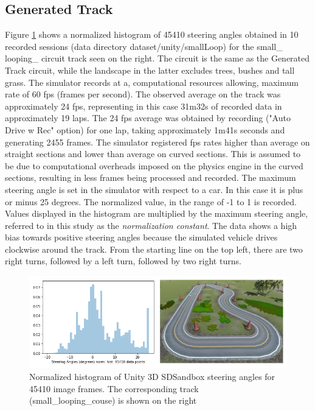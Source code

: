 \subsection{Generated Track}
Figure \ref{fig:GeneratedTrackPlusHist} shows a normalized histogram of 45410 steering angles obtained in 10 recorded sessions (data directory dataset/unity/smallLoop) for the small\_ looping\_ circuit track seen on the right. The circuit is the same as the Generated Track circuit, while the landscape in the latter excludes trees, bushes and tall grass. The simulator records at a, computational resources allowing, maximum rate of 60 fps (frames per second). The observed average on the track was approximately 24 fps, representing in this case 31m32s of recorded data in approximately 19 laps. The 24 fps average was obtained by recording ("Auto Drive w Rec" option) for one lap, taking approximately 1m41s seconds and generating 2455 frames. The simulator registered fps rates higher than average on straight sections and lower than average on curved sections. This is assumed to be due to computational overheads imposed on the physics engine in the curved sections, resulting in less frames being processed and recorded. The maximum steering angle is set in the simulator with respect to a car. In this case it is plus or minus 25 degrees. The normalized value, in the range of -1 to 1 is recorded. Values displayed in the histogram are multiplied by the maximum steering angle, referred to in this study as the \textit{normalization constant}. The data shows a high bias towards positive steering angles because the simulated vehicle drives clockwise around the track. From the starting line on the top left, there are two right turns, followed by a left turn, followed by two right turns.
\begin{figure}[ht]
 \centering 
 \includegraphics[width=\textwidth]{Figures/GeneratedTrackPlusHistogram.png}
 \caption{Normalized histogram of Unity 3D SDSandbox steering angles for 45410 image frames. The corresponding track (small\_looping\_couse) is shown on the right}
 \label{fig:GeneratedTrackPlusHist}
\end{figure}

